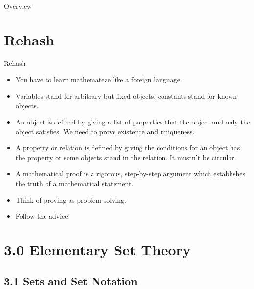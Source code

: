 \setcounter{framenumber}{63}
\begin{frame}
  \maketitle
\end{frame}

\begin{frame}{Overview}
\tableofcontents
\end{frame}

\section{Rehash}
\begin{frame}{Rehash}

\begin{itemize}

	\item You have to learn mathemateze like a foreign language.
	
	\item Variables stand for arbitrary but fixed objects, constants stand for known objects. 

	\item \alert{An object is defined by giving a list of properties that the object and only the object satisfies. We need to prove existence and uniqueness.}	
				
		\item \alert{A property or relation is defined by giving the conditions for an object has the property or some objects stand in the relation. It mustn't be circular.}
		
		\item  \alert{A mathematical proof is a rigorous, step-by-step argument which establishes the truth of a mathematical statement.} 

		\item Think of proving as problem solving. 
		
		\item Follow the advice!


\end{itemize}

\end{frame}

\section{3.0 Elementary Set Theory}
\subsection{3.1 Sets and Set Notation}

